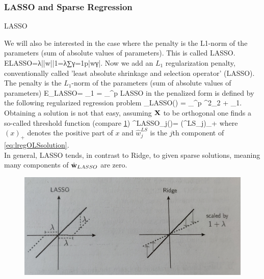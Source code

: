 \subsubsection{LASSO and Sparse Regression}
\begin{mybox}{LASSO}

	We will also be interested in the case where the penalty is the L1-norm of the parameters (sum of absolute values of parameters). This is called LASSO.
	ELASSO=λ||w||1=λ∑γ=1p|wγ|.
	Now we add an $L_1$ regularization penalty, conventionally called ’least absolute shrinkage and selection operator’ (LASSO). The penalty is the $L_1$-norm of the parameters (sum of absolute values of parameters)
	\be 
	E_{LASSO}= \lambda \norm{\mw}_1 = \lambda_{}^p \abs{\mw_\gamma}
	\ee 
	LASSO in the penalized form is defined by the following regularized regression problem
	\be 
	\label{eq:lregLASSO}
	\hat{\mw}_{LASSO}(\lambda) = \arg \min_{\mw \in \mR^p} \norm{\mX \mw - \my }^2_2 + \lambda \norm{\mw}_1.
	\ee 
	Obtaining a solution is not that easy, assuming $\mathbf{X}$ to be orthogonal one finds a so-called threshold function (compare \ref{fig:lassovsridge})
	\be 
	\label{eq:lregLASSOSol}
	^{LASSO}_j(\lambda)= (^{LS}_j)_+
	\ee 
	where $(x)_+$ denotes the positive part of $x$ and $\hat{w}^{LS}_j$ is the $j$th component of \ref{eq:lregOLSsolution}.\\
	In general, LASSO tends, in contrast to Ridge, to given sparse solutions, meaning many components of $\hat{\mathbf{w}}_{LASSO}$ are zero.
\end{mybox}
\begin{figure}[h!]
	\centering
	\includegraphics[width=0.7\linewidth]{gfx/LassoVsRidge}
	\caption{}
	\label{fig:lassovsridge}
\end{figure}






